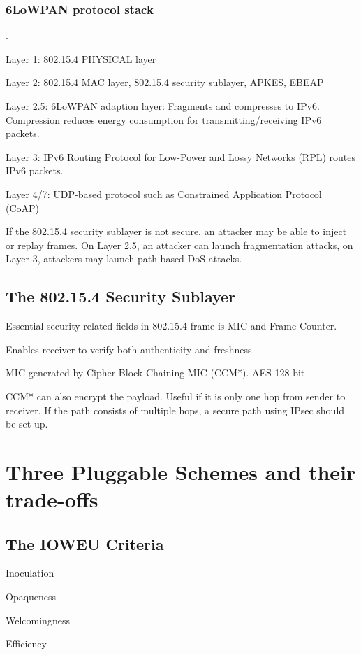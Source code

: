 \documentclass[10pt]{article}
\begin{document}
\subsubsection{6LoWPAN protocol stack}
.

Layer 1: 802.15.4 PHYSICAL layer

Layer 2: 802.15.4 MAC layer, 802.15.4 security sublayer, APKES, EBEAP

Layer 2.5: 6LoWPAN adaption layer: Fragments and compresses to IPv6. Compression reduces energy consumption for transmitting/receiving IPv6 packets.

Layer 3: IPv6 Routing Protocol for Low-Power and Lossy Networks (RPL) routes IPv6 packets. 

Layer 4/7: UDP-based protocol such as Constrained Application Protocol (CoAP)

If the 802.15.4 security sublayer is not secure, an attacker may be able to inject or replay frames. On Layer 2.5, an attacker can launch fragmentation attacks, on Layer 3, attackers may launch path-based DoS attacks.

\subsection{The 802.15.4 Security Sublayer}
\noindent

Essential security related fields in 802.15.4 frame is MIC and Frame Counter.

Enables receiver to verify both authenticity and freshness.

MIC generated by Cipher Block Chaining MIC (CCM*). AES 128-bit

CCM* can also encrypt the payload. Useful if it is only one hop from sender to receiver. If the path consists of multiple hops, a secure path using IPsec should be set up.

\section{Three Pluggable Schemes and their trade-offs}

\subsection{The IOWEU Criteria}
\noindent

Inoculation

Opaqueness

Welcomingness

Efficiency
\end{document}
